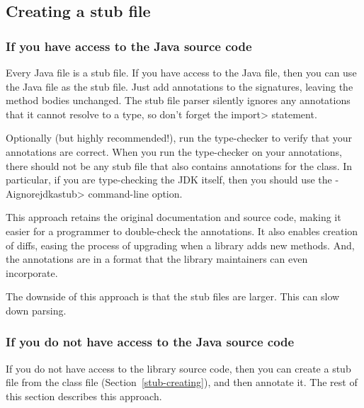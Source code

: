 \subsection{Creating a stub file\label{stub-creating}}


\subsubsection{If you have access to the Java source code\label{stub-creating-with-source}}

Every Java file is a stub file.  If you have access to the Java file, then
you can use the Java file as the stub file.  Just add
annotations to the signatures, leaving the method bodies unchanged.
The stub file parser silently ignores any annotations that it cannot
resolve to a type, so don't forget the \<import> statement.

Optionally (but highly recommended!), run the type-checker to verify that
your annotations are correct.  When you run the type-checker on your
annotations, there should not be any stub file that also contains
annotations for the class.  In particular, if you are type-checking the JDK
itself, then you should use the \<-Aignorejdkastub> command-line option.

This approach retains the original
documentation and source code, making it easier for a programmer to
double-check the annotations.  It also enables creation of diffs, easing
the process of upgrading when a library adds new methods.  And, the
annotations are in a format that the library maintainers can even
incorporate.

The downside of this approach is that the stub files are larger.  This can
slow down parsing.


\subsubsection{If you do not have access to the Java source code\label{stub-creating-without-source}}

If you do not have access to the library source code, then you can create a
stub file from the class file (Section~\ref{stub-creating}),
and then annotate it.  The rest of this section describes this approach.



